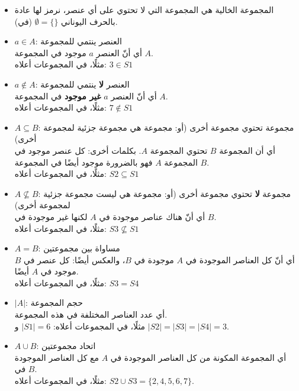 \documentclass[12pt]{article}
\begin{document}
\begin{itemize}
\item المجموعة الخالية هي المجموعة التي لا تحتوي على أي عنصر، نرمز لها عادة بالحرف اليوناني $\emptyset = \{\}$ (في).

\item $a \in A$: العنصر ينتمي للمجموعة\\
أي أنّ العنصر $a$ موجود في المجموعة $A$. \\
مثلًا، في المجموعات أعلاه: $3 \in S1$

\item $a \notin A$: العنصر \textbf{لا} ينتمي للمجموعة \\
أي أنّ العنصر $a$ \textbf{غير موجود} في المجموعة $A$. \\
مثلًا، في المجموعات أعلاه: $7 \notin S1$

\item $A \subseteq B$: مجموعة تحتوي مجموعة أخرى (أو: مجموعة هي مجموعة جزئية لمجموعة أخرى) \\
أي أن المجموعة $B$ تحتوي المجموعة $A$. بكلمات أخرى: كل عنصر موجود في المجموعة $A$ فهو بالضرورة موجود أيضًا في المجموعة $B$.\\
مثلًا، في المجموعات أعلاه: $S2 \subseteq S1$

\item $A \nsubseteq B$: مجموعة \textbf{لا} تحتوي مجموعة أخرى (أو: مجموعة هي ليست مجموعة جزئية لمجموعة أخرى) \\
أي أنّ هناك عناصر موجودة في $A$ لكنها غير موجودة في $B$. \\
مثلًا، في المجموعات أعلاه: $S3 \nsubseteq S1$

\item $A = B$: مساواة بين مجموعتين \\
أي أنّ كل العناصر الموجودة في $A$ موجودة في $B$، والعكس أيضًا: كل عنصر في $B$ موجود في $A$ أيضًا. \\
مثلًا، في المجموعات أعلاه: $S3 = S4$

\item $|A|$: حجم المجموعة \\
أي عدد العناصر المختلفة في هذه المجموعة. \\
مثلًا، في المجموعات أعلاه: $|S1| = 6$ و $|S2| = |S3| = |S4| = 3$.

\item $A \cup B$: اتحاد مجموعتين \\
أي المجموعة المكونة من كل العناصر الموجودة في $A$ مع كل العناصر الموجودة في $B$. \\
مثلًا، في المجموعات أعلاه: $S2 \cup S3 = \{2, 4, 5, 6, 7 \}$.


\end{itemize}
\end{document}
